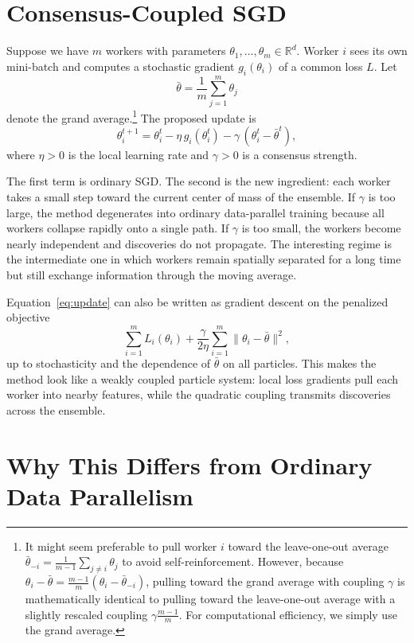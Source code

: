 \documentclass{article}
\begin{document}
\section{Consensus-Coupled SGD}

Suppose we have $m$ workers with parameters
$\theta_1, \dots, \theta_m \in \mathbb{R}^d$. Worker $i$ sees its own
mini-batch and computes a stochastic gradient $g_i(\theta_i)$ of a
common loss $L$. Let
\[
\bar{\theta} = \frac{1}{m} \sum_{j=1}^m \theta_j
\]
denote the grand average.\footnote{It might seem preferable to pull worker $i$ toward the leave-one-out average $\bar{\theta}_{-i} = \frac{1}{m-1}\sum_{j \neq i} \theta_j$ to avoid self-reinforcement. However, because $\theta_i - \bar{\theta} = \frac{m-1}{m}(\theta_i - \bar{\theta}_{-i})$, pulling toward the grand average with coupling $\gamma$ is mathematically identical to pulling toward the leave-one-out average with a slightly rescaled coupling $\gamma \frac{m-1}{m}$. For computational efficiency, we simply use the grand average.} The proposed update is
\begin{equation}\label{eq:update}
\theta_i^{t+1}
= \theta_i^t - \eta\, g_i(\theta_i^t)
- \gamma\,(\theta_i^t - \bar{\theta}^t),
\end{equation}
where $\eta > 0$ is the local learning rate and $\gamma > 0$ is a
consensus strength.

The first term is ordinary SGD. The second is the new ingredient: each
worker takes a small step toward the current center of mass of the
ensemble. If $\gamma$ is too large, the method degenerates into ordinary
data-parallel training because all workers collapse rapidly onto a
single path. If $\gamma$ is too small, the workers become nearly
independent and discoveries do not propagate. The interesting regime is
the intermediate one in which workers remain spatially separated for a
long time but still exchange information through the moving average.

Equation~\eqref{eq:update} can also be written as gradient descent on
the penalized objective
\[
\sum_{i=1}^m L_i(\theta_i)
+ \frac{\gamma}{2\eta} \sum_{i=1}^m \|\theta_i - \bar{\theta}\|^2,
\]
up to stochasticity and the dependence of $\bar{\theta}$ on all
particles. This makes the method look like a weakly coupled particle
system: local loss gradients pull each worker into nearby features,
while the quadratic coupling transmits discoveries across the ensemble.

\section{Why This Differs from Ordinary Data Parallelism}
\end{document}
